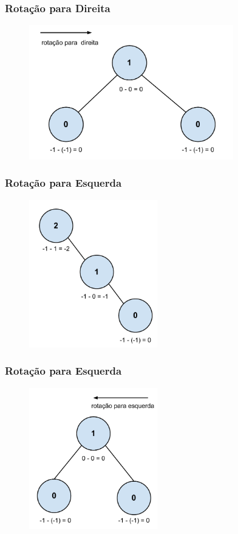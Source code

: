\begin{frame}
    \frametitle{Rotação para Direita}
    
    \begin{figure}[tbp]
    \includegraphics[keepaspectratio=true,width=3.5in]{figs/fig_arvores/Balanceamento_Arvore3}
    \centering
    \end{figure}
\end{frame}


\begin{frame}
    \frametitle{Rotação para Esquerda}
    
    \begin{figure}[tbp]
    \includegraphics[keepaspectratio=true,width=2.2in]{figs/fig_arvores/Balanceamento_Arvore4}
    \centering
    \end{figure}
\end{frame}

\begin{frame}
    \frametitle{Rotação para Esquerda}
    
    \begin{figure}[tbp]
    \includegraphics[keepaspectratio=true,width=2.2in]{figs/fig_arvores/Balanceamento_Arvore5}
    \centering
    \end{figure}
\end{frame}

